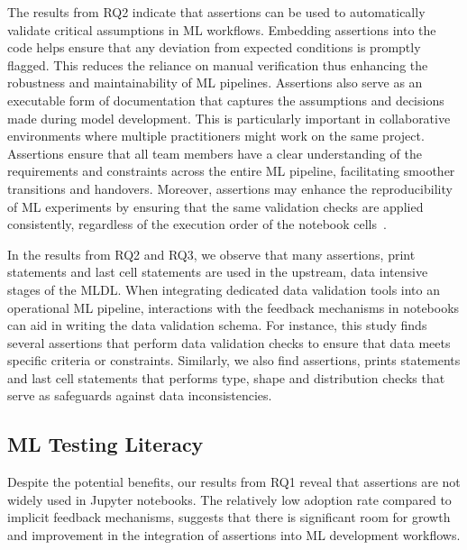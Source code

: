 The results from RQ2 indicate that assertions can be used to automatically validate critical assumptions in ML workflows. Embedding assertions into the code helps ensure that any deviation from expected conditions is promptly flagged. This reduces the reliance on manual verification thus enhancing the robustness and maintainability of ML pipelines. Assertions also serve as an executable form of documentation that captures the assumptions and decisions made during model development. This is particularly important in collaborative environments where multiple practitioners might work on the same project. Assertions ensure that all team members have a clear understanding of the requirements and constraints across the entire ML pipeline, facilitating smoother transitions and handovers. Moreover, assertions may enhance the reproducibility of ML experiments by ensuring that the same validation checks are applied consistently, regardless of the execution order of the notebook cells~\cite{wang2020assessing}.

In the results from RQ2 and RQ3, we observe that many assertions, print statements and last cell statements are used in the upstream, data intensive stages of the MLDL. When integrating dedicated data validation tools into an operational ML pipeline, interactions with the feedback mechanisms in notebooks can aid in writing the data validation schema. For instance, this study finds several assertions that perform data validation checks to ensure that data meets specific criteria or constraints. Similarly, we also find assertions, prints statements and last cell statements that performs type, shape and distribution checks that serve as safeguards against data inconsistencies.

\subsection{ML Testing Literacy}

Despite the potential benefits, our results from RQ1 reveal that assertions are not widely used in Jupyter notebooks. The relatively low adoption rate compared to implicit feedback mechanisms, suggests that there is significant room for growth and improvement in the integration of assertions into ML development workflows.

